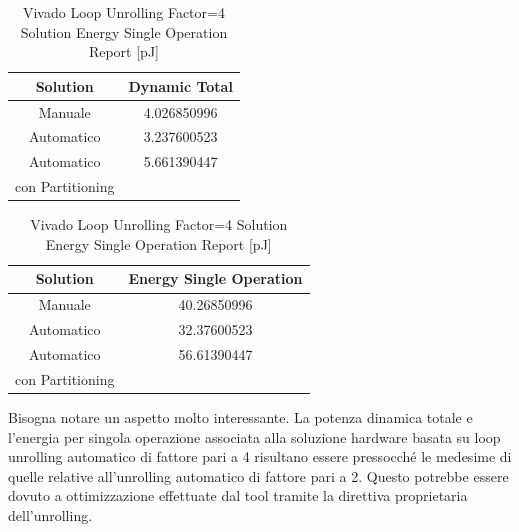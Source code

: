 \begin{table}[H]
    \centering
    \begin{minipage}[t]{0.45\linewidth}
        \centering
        \begin{tabular}{|c|c|}
            \hline
            \textbf{Solution} & \textbf{Dynamic Total} \\
            \hline
            Manuale & 4.026850996 \\
            \hline
            Automatico & 3.237600523 \\
            \hline
            Automatico & 5.661390447 \\
            con Partitioning & \\
            \hline
        \end{tabular}
        \caption{Vivado Loop Unrolling Factor=4 Solution Dynamic Power Report [mW]}
        \label{tab:vivado-loop-unrolling-factor4-solution-dynamic-power-reproot}
    \end{minipage}
    \hfill
    \centering
    \begin{minipage}[t]{0.45\linewidth}
        \centering
        \begin{tabular}{|c|c|}
            \hline
            \textbf{Solution} & \textbf{Energy Single Operation} \\
            \hline
            Manuale & 40.26850996 \\
            \hline
            Automatico & 32.37600523 \\
            \hline
            Automatico & 56.61390447 \\
            con Partitioning & \\
            \hline
        \end{tabular}
        \caption{Vivado Loop Unrolling Factor=4 Solution Energy Single Operation Report [pJ]}
        \label{tab:vivado-loop-unrolling-factor4-solution-solution-energy-single-operation-reproot}
    \end{minipage}
\end{table}

Bisogna notare un aspetto molto interessante. La potenza dinamica totale e l'energia per singola operazione associata alla soluzione hardware basata su loop unrolling automatico di fattore pari a 4 risultano essere pressocché le medesime di quelle relative all'unrolling automatico di fattore pari a 2. Questo potrebbe essere dovuto a ottimizzazione effettuate dal tool tramite la direttiva proprietaria dell'unrolling.